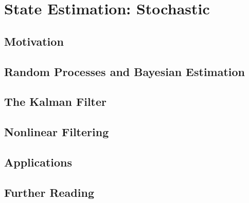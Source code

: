 \chapter{State Estimation: Stochastic} \label{ch:kalman}

    \section{Motivation}

    \section{Random Processes and Bayesian Estimation}

    \section{The Kalman Filter}

    \section{Nonlinear Filtering}

    \section{Applications}

    \section{Further Reading}